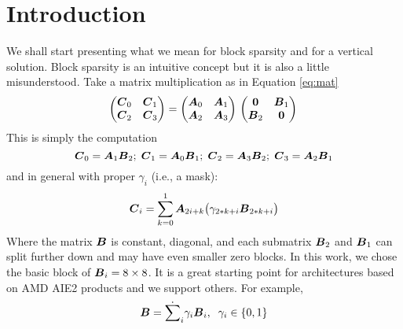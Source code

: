 \documentclass[sigconf]{acmart}
\begin{document}
\maketitle


\section{Introduction}
\label{sec:introduction}

We shall start presenting what we mean for block sparsity and for a
vertical solution. Block sparsity is an intuitive concept but it is
also a little misunderstood. Take a matrix multiplication as in
Equation \ref{eq:mat}
\begin{equation}
  \label{eq:mat}
  \begin{pmatrix}
    {\boldsymbol C}_0 & {\boldsymbol C}_1 \\
    {\boldsymbol C}_2 & {\boldsymbol C}_3 \\ 
  \end{pmatrix} = 
  \begin{pmatrix}
    {\boldsymbol A}_0 & {\boldsymbol A}_1 \\
    {\boldsymbol A}_2 & {\boldsymbol A}_3 \\ 
  \end{pmatrix}\\
  \begin{pmatrix}
    {\boldsymbol 0}   & {\boldsymbol B}_1 \\
    {\boldsymbol B}_2 & {\boldsymbol 0} \\ 
  \end{pmatrix}\\
\end{equation}
This is simply the computation
{\small \begin{equation}
  {\boldsymbol C}_0 = {\boldsymbol A}_{1} {\boldsymbol B}_{2}; \;
  {\boldsymbol C}_1 = {\boldsymbol A}_{0} {\boldsymbol B}_{1}; \;
  {\boldsymbol C}_2 = {\boldsymbol A}_{3} {\boldsymbol B}_{2}; \;
  {\boldsymbol C}_3 = {\boldsymbol A}_{2} {\boldsymbol B}_{1}
\end{equation}}
and in general with proper $\gamma_i$ (i.e., a mask):
\begin{equation}
  {\boldsymbol C}_i = \sum_{k=0}^1 {\boldsymbol A}_{2i+ k} \big(\gamma_{2*k+i} {\boldsymbol B}_{2*k+i}\big)
\end{equation}
Where the matrix ${\boldsymbol B}$ is constant, diagonal, and each submatrix
${\boldsymbol B_2}$ and ${\boldsymbol B}_1$ can split further down and may have even
smaller zero blocks. In this work, we chose the basic block of
${\boldsymbol B}_i = 8\times 8$. It is a great starting point for architectures
based on AMD AIE2 products and we support others.  For example,
\begin{equation}
  {\boldsymbol B} = \dot{\sum}_i \gamma_i {\boldsymbol B}_i, \;\; \gamma_i \in \{0,1\} 
\end{equation}
\end{document}
